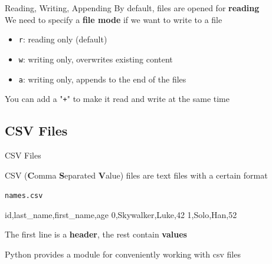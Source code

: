 \begin{frame}{Reading, Writing, Appending}
    By default, files are opened for \textbf{reading} \\
    We need to specify a \textbf{file mode} if we want to write to a file \\
    \vspace{1em}
    \begin{itemize}
        \item \texttt{r}: reading only (default)
        \item \texttt{w}: writing only, overwrites existing content
        \item \texttt{a}: writing only, appends to the end of the files
    \end{itemize}
    \vspace{1em}
    You can add a "\texttt{+}" to make it read and write at the same time
\end{frame}

\subsection{CSV Files}

\begin{frame}[fragile]{CSV Files}

    CSV (\textbf{C}omma \textbf{S}eparated \textbf{V}alue) files are text files with a certain format

    \vspace{1em}

    \begin{exampleblock}{\texttt{names.csv}}
        \begin{outputcode}
    id,last_name,first_name,age
    0,Skywalker,Luke,42
    1,Solo,Han,52
        \end{outputcode}
    \end{exampleblock}

    The first line is a \textbf{header}, the rest contain \textbf{values}

    \vspace{1em}

    Python provides a module for conveniently working with csv files


\end{frame}

